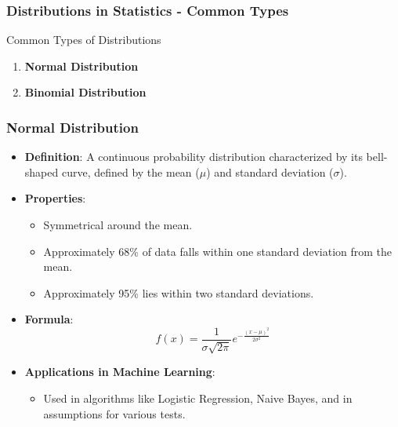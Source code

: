 \documentclass{beamer}
\begin{document}
\begin{frame}[fragile]
    \frametitle{Distributions in Statistics - Common Types}
    \begin{block}{Common Types of Distributions}
        \begin{enumerate}
            \item \textbf{Normal Distribution}
            \item \textbf{Binomial Distribution}
        \end{enumerate}
    \end{block}
\end{frame}

\begin{frame}[fragile]
    \frametitle{Normal Distribution}
    \begin{itemize}
        \item \textbf{Definition}: A continuous probability distribution characterized by its bell-shaped curve, defined by the mean ($\mu$) and standard deviation ($\sigma$).
        
        \item \textbf{Properties}:
        \begin{itemize}
            \item Symmetrical around the mean.
            \item Approximately 68\% of data falls within one standard deviation from the mean.
            \item Approximately 95\% lies within two standard deviations.
        \end{itemize}
        
        \item \textbf{Formula}:
        \begin{equation}
            f(x) = \frac{1}{\sigma\sqrt{2\pi}} e^{-\frac{(x - \mu)^2}{2\sigma^2}}
        \end{equation}

        \item \textbf{Applications in Machine Learning}:
        \begin{itemize}
            \item Used in algorithms like Logistic Regression, Naive Bayes, and in assumptions for various tests.
        \end{itemize}
    \end{itemize}
\end{frame}
\end{document}

